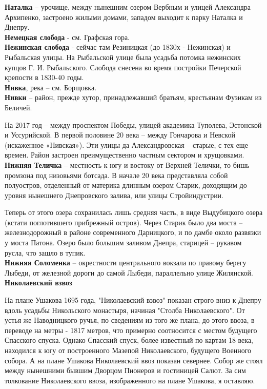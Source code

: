 \textbf{Наталка} – урочище, между нынешним озером Вербным и улицей Александра Архипенко, застроено жилыми домами, западом выходит к парку Наталка и Днепру.\\

\textbf{Немецкая слобода} - см. Графская гора.\\

\textbf{Нежинская слобода} - сейчас там Резиницкая (до 1830х - Нежинская) и Рыбальская улицы. На Рыбальской улице была усадьба потомка нежинских купцов Г. И. Рыбальского. Слобода снесена во время постройки Печерской крепости в 1830-40 годы.\\ 

\textbf{Нивка}, река – см. Борщовка.\\

\textbf{Нивки} – район, прежде хутор, принадлежавший братьям, крестьянам Фузикам из Беличей. 

На 2017 год – между проспектом Победы, улицей академика Туполева, Эстонской и Уссурийской. В первой половине 20 века – между Гончарова и Невской (искаженное «Нивская»). Эти улицы да Александровская – старые, с тех еще времен. Район застроен преимущественно частным сектором и хрущовками.\\

\textbf{Нижняя Теличка} – местность к югу и востоку от Верхней Телички, то бишь промзона под низовьями ботсада. В начале 20 века представляла собой полуостров, отделенный от материка длинным озером Старик, доходящим до уровня нынешнего Днепровского залива, или улицы Стройиндустрии. 

Теперь от этого озера сохранилась лишь средняя часть, в виде Выдубицкого озера (кстати поглотившего прибрежный остров). Через Старик было два моста – железнодорожный в районе современного Дарницкого, и по дамбе около развязки у моста Патона. Озеро было большим заливом Днепра, старицей – рукавом русла, что зашло в тупик.\\

\textbf{Нижняя Соломенка} – окрестности центра\-льного вокзала по правому берегу Лыбеди, от железной дороги до самой Лыбеди, параллельно улице Жилянской.\\

\textbf{Николаевский взвоз}

На плане Ушакова 1695 года, "Николаевский взвоз" показан строго вниз к Днепру вдоль усадьбы Никольского монастыря, начиная "Столба Николаевского". От устья же Наводницкого ручья, по сведениям из того же плана, до этого ввоза, в переводе на метры - 1817 метров, что примерно соотносится с местом будущего Спасского спуска. Однако Спасский спуск, более известный по картам 18 века, находился к югу от построенного Мазепой Николаевского, будущего Военного собора. А на плане Ушакова Николаевский ввоз показан севернее. Собор же стоял между нынешними бывшим Дворцом Пионеров и гостиницей Салют. За сим толкование Николаевского ввоза, изображенного на плане Ушакова, я оставляю. 




